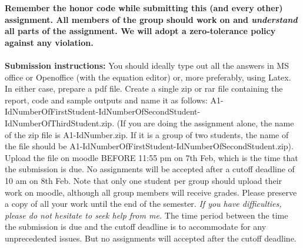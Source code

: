 \documentclass[11pt]{article}
\begin{document}
\maketitle

\textbf{Remember the honor code while submitting this (and every other) assignment. All members of the group should work on and \emph{understand} all parts of the assignment. We will adopt a \textbf{zero-tolerance policy} against any violation.}
\\
\\
\textbf{Submission instructions:} You should ideally type out all the answers in MS office or Openoffice (with the equation editor) or, more preferably, using Latex. In either case, prepare a pdf file. Create a single zip or rar file containing the report, code and sample outputs and name it as follows: A1-IdNumberOfFirstStudent-IdNumberOfSecondStudent-IdNumberOfThirdStudent.zip. (If you are doing the assignment alone, the name of the zip file is A1-IdNumber.zip. If it is a group of two students, the name of the file should be  A1-IdNumberOfFirstStudent-IdNumberOfSecondStudent.zip). Upload the file on moodle BEFORE 11:55 pm on 7th Feb, which is the time that the submission is due. No assignments will be accepted after a cutoff deadline of 10 am on 8th Feb. Note that only one student per group should upload their work on moodle, although all group members will receive grades. Please preserve a copy of all your work until the end of the semester. \emph{If you have difficulties, please do not hesitate to seek help from me.} The time period between the time the submission is due and the cutoff deadline is to accommodate for any unprecedented issues. But no assignments will accepted after the cutoff deadline. 
\end{document}
